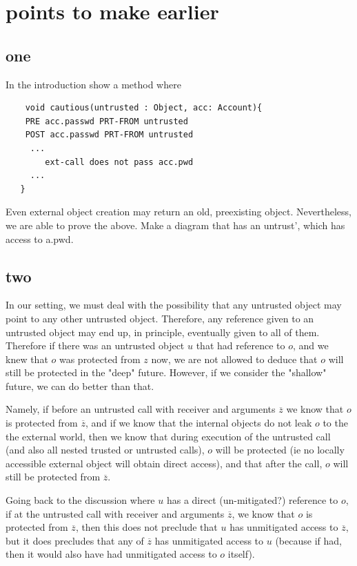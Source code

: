  \newcommand{\sdOct}[1]{#1}
\newcommand{\re}{\mathit{e}}

\section{points to make earlier}

\subsection{one}
In the introduction show a method where
\begin{lstlisting}
    void cautious(untrusted : Object, acc: Account){
    PRE acc.passwd PRT-FROM untrusted
    POST acc.passwd PRT-FROM untrusted
     ...
        ext-call does not pass acc.pwd
     ...
   }
\end{lstlisting}

Even external object creation may return an old, preexisting object.
Nevertheless, we are able to prove the above. Make a diagram that has an untrust', which has access to a.pwd. 


\subsection{two}
In our setting, we must deal with the possibility  that any untrusted object may point to any other untrusted object.
Therefore, any reference given to an untrusted object may end up, in principle,  eventually given to all of them.
Therefore if there was an untrusted object $u$ that had reference to $o$,  and we knew that $o$ was protected from $z$ now, we are not
allowed   to deduce that $o$ will still be protected in the "deep" future.
However, if we consider the "shallow" future, we can do better than that.

Namely, if  before an untrusted call with receiver and arguments $\overline z$ we know that $o$ is protected from $\overline z$, and if we know that the internal objects do not leak $o$ to the the external world, then we know that during execution of the untrusted call (and also all nested trusted or untrusted calls), $o$ will be protected (ie no locally accessible external object will obtain direct access), and that after the call, $o$ will still be protected from $\overline z$.

Going back to the discussion where $u$ has a direct (un-mitigated?) reference to $o$, if at the untrusted call with receiver and arguments $\overline z$, we know that $o$ is protected from $\overline z$, then this does not preclude that $u$ has unmitigated access to $\overline z$, but it does precludes that any of  $\overline z$ has unmitigated access to $u$ (because if had, then it would also have had unmitigated access to $o$ itself).

